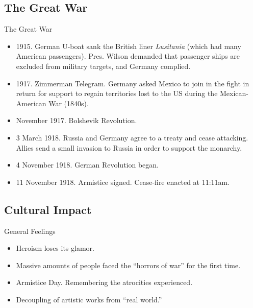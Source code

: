\subsection{The Great War}
\begin{frame}{The Great War}
	
	\begin{itemize}
		\item<1-6>1915. German U-boat sank the British liner \emph{Lusitania} (which had many American passengers). Pres. Wilson demanded that passenger ships are excluded from military targets, and Germany complied.
		\item<2-6>1917. Zimmerman Telegram. Germany asked Mexico to join in the fight in return for support to regain territories lost to the US during the Mexican-American War (1840s).
		\item<3-6>November 1917. Bolshevik Revolution.
		\item<4-6>3 March 1918. Russia and Germany agree to a treaty and cease attacking. Allies send a small invasion to Russia in order to support the monarchy.
		\item<5-6>4 November 1918. German Revolution began.
		\item<6>11 November 1918. Armistice signed. Cease-fire enacted at 11:11am.
	\end{itemize}
\end{frame}

\subsection{Cultural Impact}
\begin{frame}{General Feelings}
	\begin{itemize}
		\item<+->Heroism loses its glamor.
		\item<+->Massive amounts of people faced the ``horrors of war'' for the first time.
		\item<+->Armistice Day. Remembering the atrocities experienced.
		\item<+->Decoupling of artistic works from ``real world.''
	\end{itemize}
\end{frame}


